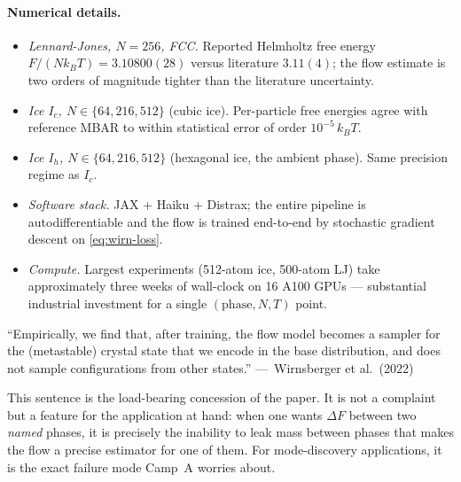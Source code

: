 \documentclass[11pt,letterpaper]{article}
\theoremstyle{plain}
\begin{document}
\paragraph{Numerical details.}
\begin{itemize}[leftmargin=1.5em,itemsep=1pt,topsep=2pt]
  \item \emph{Lennard-Jones, $N=256$, FCC.} Reported Helmholtz free energy
    $F/(Nk_BT) = 3.10800(28)$ versus literature $3.11(4)$; the flow
    estimate is two orders of magnitude tighter than the literature
    uncertainty.
  \item \emph{Ice $I_c$, $N\in\{64, 216, 512\}$} (cubic ice). Per-particle
    free energies agree with reference MBAR to within statistical error of
    order $10^{-5}\,k_BT$.
  \item \emph{Ice $I_h$, $N\in\{64, 216, 512\}$} (hexagonal ice, the
    ambient phase). Same precision regime as $I_c$.
  \item \emph{Software stack.} JAX + Haiku + Distrax; the entire pipeline
    is autodifferentiable and the flow is trained end-to-end by stochastic
    gradient descent on \eqref{eq:wirn-loss}.
  \item \emph{Compute.} Largest experiments (512-atom ice, 500-atom LJ)
    take approximately three weeks of wall-clock on 16 A100 GPUs ---
    substantial industrial investment for a single $(\text{phase}, N, T)$
    point.
\end{itemize}

\begin{killerquote}
``Empirically, we find that, after training, the flow model becomes a
sampler for the (metastable) crystal state that we encode in the base
distribution, and does not sample configurations from other states.''
\hfill---~Wirnsberger et al.\ (2022)
\end{killerquote}

This sentence is the load-bearing concession of the paper. It is not a
complaint but a feature for the application at hand: when one wants
$\Delta F$ between two \emph{named} phases, it is precisely the inability
to leak mass between phases that makes the flow a precise estimator for
one of them. For mode-discovery applications, it is the exact failure
mode Camp~A worries about.
\end{document}
